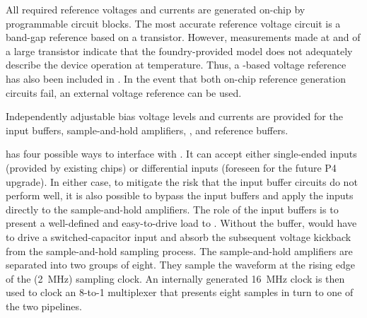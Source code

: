 All required reference voltages and currents are generated on-chip by programmable
circuit blocks. The most accurate reference voltage circuit is a band-gap reference
based on a  transistor.  However, measurements made at  and
 of a large  transistor indicate that the foundry-provided  model
does not adequately describe the device operation at \lar temperature.  Thus,
a -based voltage reference has also been included in .
In the event that both on-chip reference generation circuits fail, an external voltage
reference can be used.

Independently adjustable bias voltage levels and currents are provided for the
input buffers, sample-and-hold amplifiers, , and 
reference buffers.

 has four possible ways to interface with .  It
can accept either single-ended inputs (provided by existing 
chips) or differential inputs (foreseen for the future  P4 upgrade).
In either case, to mitigate the risk that the input buffer circuits do not perform
well, it is also possible to bypass the input buffers and apply the inputs directly
to the sample-and-hold amplifiers. The role of the input buffers is to present a well-defined
and easy-to-drive load to . Without the buffer,  would
have to drive a switched-capacitor input and absorb the subsequent voltage
kickback from the sample-and-hold sampling process. The sample-and-hold amplifiers are separated
into two groups of eight. They sample the waveform at the rising edge of the
(\SI{2}{MHz}) sampling clock. An internally generated \SI{16}{MHz} clock is then
used to clock an \num{8}-to-\num{1} multiplexer that presents eight samples in 
turn to one of the two  pipelines.

